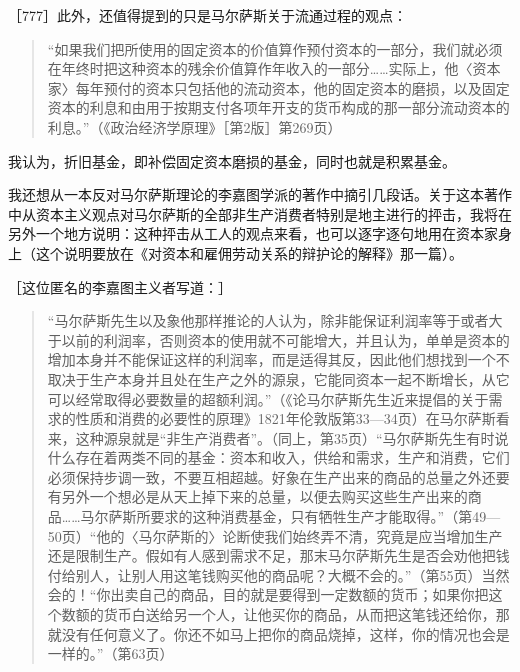 
［777］此外，还值得提到的只是马尔萨斯关于流通过程的观点：

\begin{quote}{“如果我们把所使用的固定资本的价值算作预付资本的一部分，我们就必须在年终时把这种资本的残余价值算作年收入的一部分……实际上，他〈资本家〉每年预付的资本只包括他的流动资本，他的固定资本的磨损，以及固定资本的利息和由用于按期支付各项年开支的货币构成的那一部分流动资本的利息。”（《政治经济学原理》［第2版］第269页）}\end{quote}

我认为，折旧基金，即补偿固定资本磨损的基金，同时也就是积累基金。


我还想从一本反对马尔萨斯理论的李嘉图学派的著作中摘引几段话。关于这本著作中从资本主义观点对马尔萨斯的全部非生产消费者特别是地主进行的抨击，我将在另外一个地方说明：这种抨击从工人的观点来看，也可以逐字逐句地用在资本家身上（这个说明要放在《对资本和雇佣劳动关系的辩护论的解释》那一篇）。

［这位匿名的李嘉图主义者写道：］

\begin{quote}{“马尔萨斯先生以及象他那样推论的人认为，除非能保证利润率等于或者大于以前的利润率，否则资本的使用就不可能增大，并且认为，单单是资本的增加本身并不能保证这样的利润率，而是适得其反，因此他们想找到一个不取决于生产本身并且处在生产之外的源泉，它能同资本一起不断增长，从它可以经常取得必要数量的超额利润。”（《论马尔萨斯先生近来提倡的关于需求的性质和消费的必要性的原理》1821年伦敦版第33—34页）在马尔萨斯看来，这种源泉就是“非生产消费者”。（同上，第35页）“马尔萨斯先生有时说什么存在着两类不同的基金：资本和收入，供给和需求，生产和消费，它们必须保持步调一致，不要互相超越。好象在生产出来的商品的总量之外还要有另外一个想必是从天上掉下来的总量，以便去购买这些生产出来的商品……马尔萨斯所要求的这种消费基金，只有牺牲生产才能取得。”（第49—50页）“他的〈马尔萨斯的〉论断使我们始终弄不清，究竟是应当增加生产还是限制生产。假如有人感到需求不足，那末马尔萨斯先生是否会劝他把钱付给别人，让别人用这笔钱购买他的商品呢？大概不会的。”（第55页）当然会的！“你出卖自己的商品，目的就是要得到一定数额的货币；如果你把这个数额的货币白送给另一个人，让他买你的商品，从而把这笔钱还给你，那就没有任何意义了。你还不如马上把你的商品烧掉，这样，你的情况也会是一样的。”（第63页）}\end{quote}

